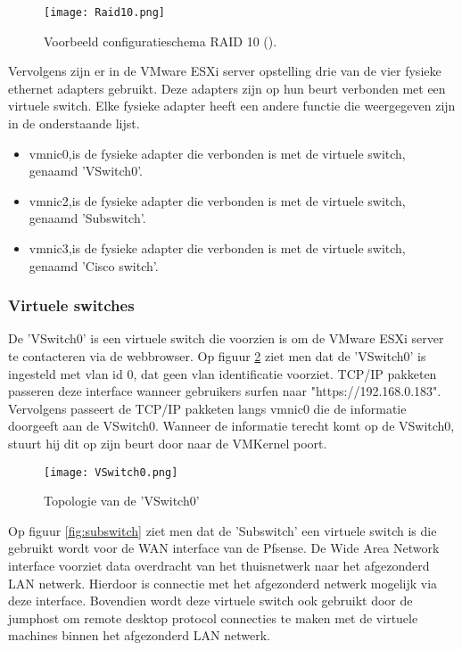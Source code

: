 \begin{figure}[H]
	\centering
	\texttt{[image: Raid10.png]}
	\caption{Voorbeeld configuratieschema RAID 10 (\cite{Raid10}).}
	\label{fig:Raid10}
\end{figure}
\newpage
Vervolgens zijn er in de VMware ESXi server opstelling drie van de vier fysieke ethernet adapters gebruikt. Deze adapters zijn op hun beurt verbonden met een virtuele switch. Elke fysieke adapter heeft een andere functie die weergegeven zijn in de onderstaande lijst. 

\begin{itemize}
	\item vmnic0,is de fysieke adapter die verbonden is met de virtuele switch, genaamd 'VSwitch0'.
	\item vmnic2,is de fysieke adapter die verbonden is met de virtuele switch, genaamd 'Sub\textunderscore switch'.
	\item vmnic3,is de fysieke adapter die verbonden is met de virtuele switch, genaamd 'Cisco \textunderscore switch'.
\end{itemize}

\subsubsection{Virtuele switches}
\newline
De 'VSwitch0' is een virtuele switch die voorzien is om de VMware ESXi server te contacteren via de webbrowser. Op figuur \ref{fig:Vswitch0} ziet men dat de 'VSwitch0' is ingesteld met vlan id 0, dat geen vlan identificatie voorziet. 
\newline
\newline
TCP/IP pakketen passeren deze interface wanneer gebruikers surfen naar "https://192.168.0.183". Vervolgens passeert de TCP/IP pakketen langs vmnic0 die de informatie doorgeeft aan de VSwitch0. Wanneer de informatie terecht komt op de VSwitch0, stuurt hij dit op zijn beurt door naar de VMKernel poort.


\begin{figure}[H]
	\centering
	\texttt{[image: VSwitch0.png]}
	\caption{Topologie van de 'VSwitch0'}
	\label{fig:Vswitch0}
\end{figure}
\newpage
{}
\newline
Op figuur \ref{fig:subswitch} ziet men dat de 'Sub\textunderscore switch' een virtuele switch is die gebruikt wordt voor de WAN interface van de Pfsense. De Wide Area Network interface voorziet data overdracht van het thuisnetwerk naar het afgezonderd LAN netwerk. Hierdoor is connectie met het afgezonderd netwerk mogelijk via deze interface. Bovendien wordt deze virtuele switch ook gebruikt door de jumphost om remote desktop protocol connecties te maken met de virtuele machines binnen het afgezonderd LAN netwerk. 

